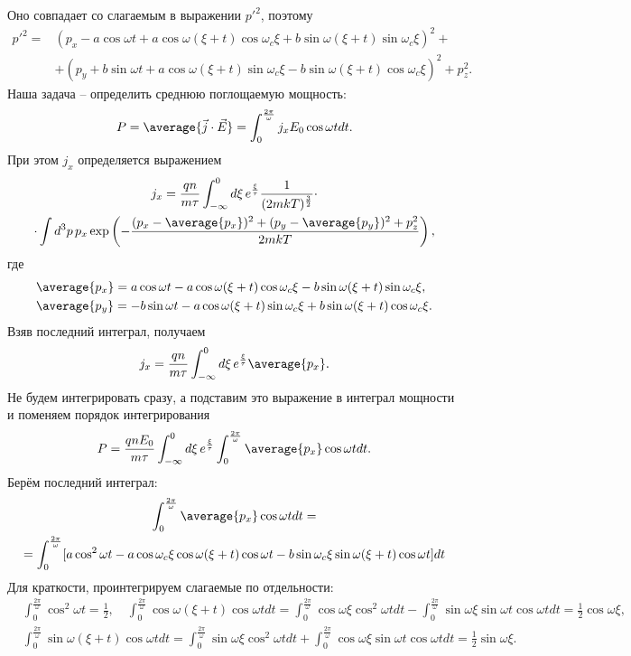 Оно совпадает со слагаемым в выражении \( {p'}^2 \), поэтому
\begin{align*}
    {p'}^2 = & (p_x - a\cos\omega t + a\cos\omega(\xi+t)\cos\omega_c\xi
    + b\sin\omega(\xi+t)\sin\omega_c\xi)^2 + \\
    & + (p_y + b\sin\omega t + a\cos\omega(\xi+t)\sin\omega_c\xi
    - b\sin\omega(\xi+t)\cos\omega_c\xi)^2 + p_z^2.
\end{align*}
Наша задача -- определить среднюю поглощаемую мощность:
\[
    P = \average{\vec{j}\cdot\vec{E}} =
    \int_0^\frac{2\pi}{\omega} j_x E_0 \cos\omega t dt.
\]
При этом \( j_x \) определяется выражением
\begin{gather*}
    j_x = \frac{qn}{m\tau} \int_{-\infty}^0 d\xi\, e^\frac{\xi}{\tau}
    \frac{1}{(2mkT)^\frac{3}{2}} \cdot \\
    \cdot \int d^3p\, p_x
    \exp\left(-\frac{(p_x - \average{p_x})^2 + (p_y - \average{p_y})^2
    + p_z^2}{2mkT}\right),
\end{gather*}
где
\begin{align*}
    & \average{p_x} = a\cos\omega t - a\cos\omega(\xi+t)\cos\omega_c\xi
    - b\sin\omega(\xi+t)\sin\omega_c\xi, \\
    & \average{p_y} = -b\sin\omega t - a\cos\omega(\xi+t)\sin\omega_c\xi
    + b\sin\omega(\xi+t)\cos\omega_c\xi.
\end{align*}
Взяв последний интеграл, получаем
\[
    j_x = \frac{qn}{m\tau} \int_{-\infty}^0 d\xi\,
    e^\frac{\xi}{\tau}\average{p_x}.
\]
Не будем интегрировать сразу, а подставим это выражение в интеграл мощности и
поменяем порядок интегрирования
\[
    P = \frac{qnE_0}{m\tau} \int_{-\infty}^0 d\xi\,
    e^\frac{\xi}{\tau}\int_0^\frac{2\pi}{\omega} \average{p_x}\cos\omega t dt.
\]
Берём последний интеграл:
\begin{gather*}
    \int_0^\frac{2\pi}{\omega} \average{p_x}\cos\omega t dt = \\ =
    \int_0^\frac{2\pi}{\omega} [a\cos^2\omega t -
    a\cos\omega_c\xi\cos\omega(\xi+t)\cos\omega t
    - b\sin\omega_c\xi\sin\omega(\xi+t)\cos\omega t] dt
\end{gather*}
Для краткости, проинтегрируем слагаемые по отдельности:
\begin{align*}
    & \int_0^\frac{2\pi}{\omega}\cos^2\omega t = \frac{1}{2}, \quad
     \int_0^\frac{2\pi}{\omega}\cos\omega(\xi+t)\cos\omega t dt =
        \int_0^\frac{2\pi}{\omega}\cos\omega\xi\cos^2\omega t dt -
        \int_0^\frac{2\pi}{\omega}\sin\omega\xi\sin\omega t\cos\omega t dt =
        \frac{1}{2}\cos\omega\xi,\\
    & \int_0^\frac{2\pi}{\omega}\sin\omega(\xi+t)\cos\omega t dt =
        \int_0^\frac{2\pi}{\omega}\sin\omega\xi\cos^2\omega t dt +
        \int_0^\frac{2\pi}{\omega}\cos\omega\xi\sin\omega t\cos\omega t dt =
        \frac{1}{2}\sin\omega\xi.
\end{align*}
